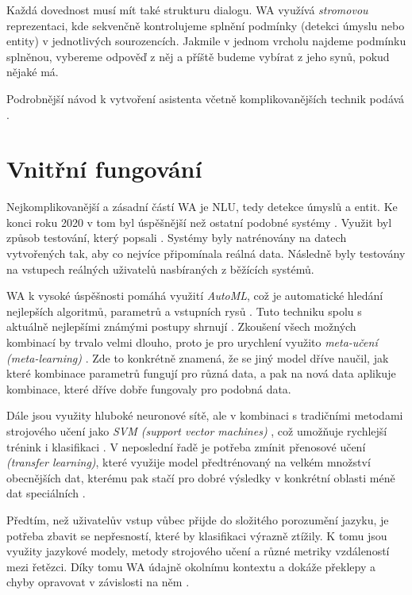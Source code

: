 Každá dovednost musí mít také strukturu dialogu.
WA využívá \textit{stromovou} reprezentaci,
kde sekvenčně kontrolujeme splnění podmínky (detekci úmyslu nebo entity) v
jednotlivých sourozencích. Jakmile v jednom vrcholu najdeme podmínku
splněnou, vybereme
odpověď z něj a příště budeme vybírat z jeho synů, pokud nějaké má.

Podrobnější návod k vytvoření asistenta včetně komplikovanějších
technik podává \citet{akbulut_common_2020}.

\section{Vnitřní fungování}\label{wa-inside}

Nejkomplikovanější a zásadní částí WA je NLU, tedy detekce úmyslů
a entit. Ke konci roku 2020 v tom byl úspěšnější než ostatní podobné
systémy \citep{qi2021benchmarking}. Využit byl způsob testování,
který popsali \citet{arora-etal-2020-hint3}. Systémy byly natrénovány
na datech vytvořených tak, aby co nejvíce připomínala reálná data.
Následně byly testovány na vstupech reálných uživatelů nasbíraných
z běžících systémů.

WA k vysoké úspěšnosti pomáhá využití \textit{AutoML}, což je
automatické hledání nejlepších algoritmů,
parametrů a vstupních rysů \citep{noauthor_watson_2020}. Tuto techniku
spolu s aktuálně nejlepšími známými postupy shrnují \citet[duben]{He_2021}.
Zkoušení všech
možných kombinací by trvalo velmi dlouho, proto je pro urychlení
využito \textit{meta-učení (meta-learning)} \citep{hospedales2020metalearning}.
Zde to konkrétně znamená, že se jiný model dříve naučil, jak které
kombinace parametrů fungují pro
různá data, a pak na nová data aplikuje kombinace, které dříve dobře
fungovaly pro podobná data.

Dále jsou využity hluboké neuronové sítě, ale v kombinaci s tradičními
metodami strojového učení jako \textit{SVM (support vector machines)}
\citep{bosertraining}, což umožňuje
rychlejší trénink i klasifikaci \citep{potdar_watson_2021}. V neposlední
řadě je potřeba zmínit přenosové učení \textit{(transfer learning)}, které
využije model předtrénovaný
na velkém množství obecnějších dat, kterému pak stačí pro dobré výsledky
v konkrétní oblasti méně dat speciálních \citep{zhuang2020comprehensive}.

Předtím, než uživatelův vstup vůbec přijde do složitého porozumění jazyku,
je potřeba zbavit se nepřesností, které by klasifikaci výrazně ztížily.
K tomu jsou využity jazykové modely, metody strojového učení a
různé metriky vzdáleností mezi řetězci. Díky tomu WA údajně 
okolnímu kontextu a dokáže překlepy a chyby opravovat v závislosti
na něm \citep{mason_ahnouncing_2019}.
